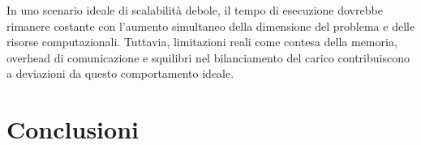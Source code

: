\documentclass[letterpaper,11pt,leqno]{article}
\begin{document}
In uno scenario ideale di scalabilità debole, il tempo di esecuzione dovrebbe rimanere costante con l'aumento simultaneo della dimensione del problema e delle risorse computazionali. Tuttavia, limitazioni reali come contesa della memoria, overhead di comunicazione e squilibri nel bilanciamento del carico contribuiscono a deviazioni da questo comportamento ideale.



\section{Conclusioni}
\end{document}
